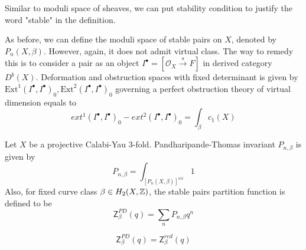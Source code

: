 \begin{rem}
   Similar to moduli space of sheaves, we can put stability condition to justify the word "stable" in the definition.
\end{rem}
As before, we can define the moduli space of stable pairs on $X$, denoted by $P_n(X,\beta)$. However, again, it does not admit virtual class. The way to remedy this is to consider a pair as an object $I^{\bullet}=[\mathcal{O}_X \xrightarrow{s} F]$ in derived category $D^b(X)$. Deformation and obstruction spaces with fixed determinant is given by $\text{Ext}^1(I^{\bullet}, I^{\bullet})_0, \text{Ext}^2(I^{\bullet}, I^{\bullet})_0$ governing a perfect obstruction theory of virtual dimension equals to 
\begin{equation*}
    ext^1(I^{\bullet}, I^{\bullet})_0-ext^2(I^{\bullet}, I^{\bullet})_0= \int_{\beta}c_1(X)
\end{equation*}
\begin{defin}
Let $X$ be a projective Calabi-Yau 3-fold. Pandharipande-Thomas invariant $P_{n, \beta}$ is given by
    \begin{equation*}
        P_{n,\beta}=\int_{[P_n(X,\beta)]^{vir}}1
    \end{equation*}
    Also, for fixed curve class $\beta \in H_2(X,\mathbb Z)$, the stable pairs partition function is defined to be 
    \begin{equation*}
        \mathsf{Z}^{PD}_{\beta}(q)=\sum_n P_{n,\beta}q^n
    \end{equation*}
\end{defin}
\begin{thm}
    \[\mathsf{Z}^{PD}_{\beta}(q)= \mathsf{Z}^{red}_{\beta}(q)\]
\end{thm}

